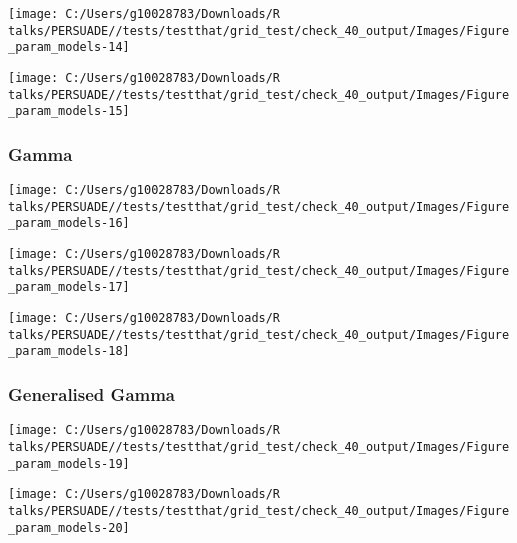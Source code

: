 \documentclass[
]{article}
\begin{document}
\begin{flushleft}\texttt{[image: C:/Users/g10028783/Downloads/R talks/PERSUADE//tests/testthat/grid\_test/check\_40\_output/Images/Figure\_param\_models-14]} \end{flushleft}

\begin{flushleft}\texttt{[image: C:/Users/g10028783/Downloads/R talks/PERSUADE//tests/testthat/grid\_test/check\_40\_output/Images/Figure\_param\_models-15]} \end{flushleft}

\clearpage

\subsubsection{Gamma}\label{gamma}

\begin{flushleft}\texttt{[image: C:/Users/g10028783/Downloads/R talks/PERSUADE//tests/testthat/grid\_test/check\_40\_output/Images/Figure\_param\_models-16]} \end{flushleft}

\begin{flushleft}\texttt{[image: C:/Users/g10028783/Downloads/R talks/PERSUADE//tests/testthat/grid\_test/check\_40\_output/Images/Figure\_param\_models-17]} \end{flushleft}

\begin{flushleft}\texttt{[image: C:/Users/g10028783/Downloads/R talks/PERSUADE//tests/testthat/grid\_test/check\_40\_output/Images/Figure\_param\_models-18]} \end{flushleft}

\clearpage

\subsubsection{Generalised Gamma}\label{generalised-gamma}

\begin{flushleft}\texttt{[image: C:/Users/g10028783/Downloads/R talks/PERSUADE//tests/testthat/grid\_test/check\_40\_output/Images/Figure\_param\_models-19]} \end{flushleft}

\begin{flushleft}\texttt{[image: C:/Users/g10028783/Downloads/R talks/PERSUADE//tests/testthat/grid\_test/check\_40\_output/Images/Figure\_param\_models-20]} \end{flushleft}
\end{document}
